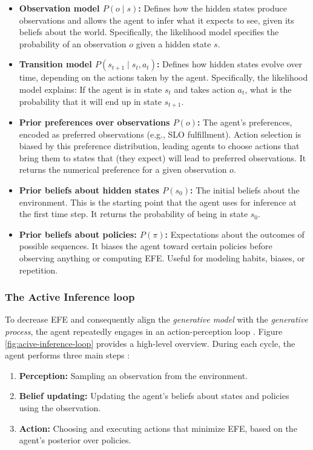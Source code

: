 \begin{itemize}
  \item \textbf{Observation model \(P(o \mid s)\):} Defines how the hidden states produce observations and allows the agent to infer what it expects to see, given its beliefs about the world. Specifically, the likelihood model specifies the probability of an observation \(o\) given a hidden state \(s\). 
  \item \textbf{Transition model \(P(s_{t+1} \mid s_t,a_t)\):} Defines how hidden states evolve over time, depending on the actions taken by the agent. Specifically, the likelihood model explains: If the agent is in state \(s_t\) and takes action \(a_t\), what is the probability that it will end up in state \(s_{t+1}\). 
  \item \textbf{Prior preferences over observations \(P(o)\):} The agent's preferences, encoded as preferred observations (e.g., SLO fulfillment). Action selection is biased by this preference distribution, leading agents to choose actions that bring them to states that (they expect) will lead to preferred observations. It returns the numerical preference for a given observation \(o\).
  \item \textbf{Prior beliefs about hidden states \(P(s_0)\):} The initial beliefs about the environment. This is the starting point that the agent uses for inference at the first time step. It returns the probability of being in state \(s_0\).
  \item \textbf{Prior beliefs about policies: \(P(\pi)\):} Expectations about the outcomes of possible sequences. It biases the agent toward certain policies before observing anything or computing EFE. Useful for modeling habits, biases, or repetition.
\end{itemize}

\subsubsection{The Active Inference loop}
\label{sec:active-inference-loop}
To decrease EFE and consequently align the \textit{generative model} with the \textit{generative process}, the agent repeatedly engages in an action-perception loop \cite{sedlak_equilibrium_2024}. Figure \ref{fig:acive-inference-loop} provides a high-level overview. During each cycle, the agent performs three main steps \cite{heins_pymdp_2022}:
\begin{enumerate}
    \item \textbf{Perception:} Sampling an observation from the environment.
    \item \textbf{Belief updating:} Updating the agent’s beliefs about states and policies using the
observation.
    \item \textbf{Action:} Choosing and executing actions that minimize EFE, based on the agent’s posterior over policies.
\end{enumerate}

